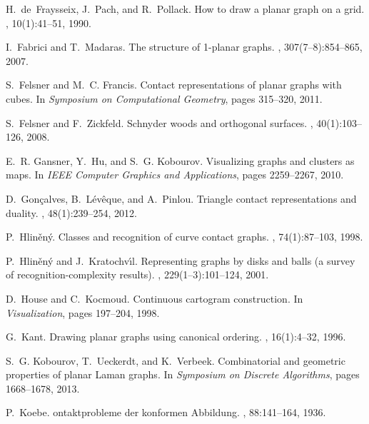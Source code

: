 \documentclass{article}
\begin{document}
\begin{thebibliography}{10}
H.~de~Fraysseix, J.~Pach, and R.~Pollack.
\newblock How to draw a planar graph on a grid.
, 10(1):41--51, 1990.

I.~Fabrici and T.~Madaras.
\newblock The structure of 1-planar graphs.
, 307(7--8):854--865, 2007.

S.~Felsner and M.~C. Francis.
\newblock Contact representations of planar graphs with cubes.
\newblock In {\em Symposium on Computational Geometry}, pages 315--320, 2011.

S.~Felsner and F.~Zickfeld.
\newblock Schnyder woods and orthogonal surfaces.
, 40(1):103--126, 2008.

E.~R. Gansner, Y.~Hu, and S.~G. Kobourov.
\newblock Visualizing graphs and clusters as maps.
\newblock In {\em IEEE Computer Graphics and Applications}, pages 2259--2267,
  2010.

D.~Gon\c{c}alves, B.~L{\'e}v{\^e}que, and A.~Pinlou.
\newblock Triangle contact representations and duality.
, 48(1):239--254, 2012.

P.~Hlin\v{e}n\'{y}.
\newblock Classes and recognition of curve contact graphs.
, 74(1):87--103, 1998.

P.~Hlin\v{e}n\'{y} and J.~Kratochv{\'\i}l.
\newblock Representing graphs by disks and balls (a survey of
  recognition-complexity results).
, 229(1--3):101--124, 2001.

D.~House and C.~Kocmoud.
\newblock Continuous cartogram construction.
\newblock In {\em Visualization}, pages 197--204, 1998.

G.~Kant.
\newblock Drawing planar graphs using canonical ordering.
, 16(1):4--32, 1996.

S.~G. Kobourov, T.~Ueckerdt, and K.~Verbeek.
\newblock Combinatorial and geometric properties of planar {L}aman graphs.
\newblock In {\em Symposium on Discrete Algorithms}, pages 1668--1678, 2013.

P.~Koebe.
ontaktprobleme der konformen {A}bbildung.
, 88:141--164, 1936.


\end{thebibliography}
\end{document}
